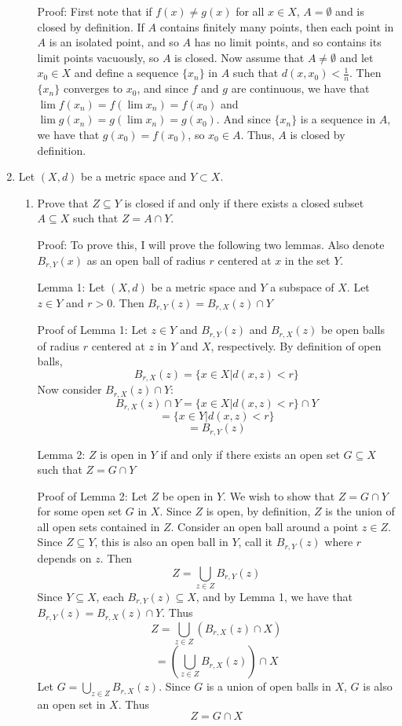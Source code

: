 \documentclass{article}
\begin{document}
\begin{enumerate}
\begin{enumerate}
    Proof: First note that if $f(x) \neq g(x)$ for all $x \in X$, $A = \emptyset$ and is closed by definition. If $A$ contains finitely many points, then each point in $A$ is an isolated point, and so $A$ has no limit points, and so contains its limit points vacuously, so $A$ is closed. Now assume that $A \neq \emptyset$ and let $x_0 \in X$ and define a sequence $\{x_n\}$ in $A$ such that $d(x,x_0) < \frac{1}{n}$. Then $\{x_n\}$ converges to $x_0$, and since $f$ and $g$ are continuous, we have that $\lim f(x_n) = f( \lim x_n) = f(x_0)$ and $\lim g(x_n) = g( \lim x_n) = g(x_0)$. And since $\{x_n\}$ is a sequence in $A$, we have that $g(x_0) = f(x_0)$, so $x_0 \in A$. Thus, $A$ is closed by definition.
    
    
    \end{enumerate}
    
    \item Let $(X,d)$ be a metric space and $Y \subset X$.
    \begin{enumerate}
        \item Prove that $Z \subseteq Y$ is closed if and only if there exists a closed subset $A \subseteq X$ such that $Z = A \cap Y$.
        
        Proof: To prove this, I will prove the following two lemmas. Also denote $B_{r,Y}(x)$ as an open ball of radius $r$ centered at $x$ in the set $Y$.
        \begin{center}
            Lemma 1: Let $(X,d)$ be a metric space and $Y$ a subspace of $X$. Let $z \in Y$ and $r > 0$. Then $B_{r,Y}(z) = B_{r,X}(z) \cap Y$
        \end{center}
        Proof of Lemma 1: Let $z \in Y$ and $B_{r,Y}(z)$ and $B_{r, X}(z)$ be open balls of radius $r$ centered at $z$ in $Y$ and $X$, respectively. By definition of open balls,
        \[B_{r,X}(z) = \{x \in X | d(x,z) < r\}\]
        Now consider $B_{r,X}(z) \cap Y$:
        \[B_{r,X}(z) \cap Y = \{x \in X | d(x,z) < r\} \cap Y\]
        \[ = \{x \in Y | d(x,z) < r\}\]
        \[ = B_{r,Y}(z)\]
        
        \begin{center}
            Lemma 2: $Z$ is open in $Y$ if and only if there exists an open set $G \subseteq X$ such that $Z = G \cap Y$
        \end{center}
        Proof of Lemma 2: Let $Z$ be open in $Y$. We wish to show that $Z = G \cap Y$ for some open set $G$ in $X$. Since $Z$ is open, by definition, $Z$ is the union of all open sets contained in $Z$. Consider an open ball around a point $z \in Z$. Since $Z \subseteq Y$, this is also an open ball in $Y$, call it $B_{r,Y}(z)$ where $r$ depends on $z$. Then
        \[Z = \bigcup_{z \in Z} B_{r,Y}(z)\]
        Since $Y \subseteq X$, each $B_{r,Y}(z) \subseteq X$, and by Lemma 1, we have that $B_{r,Y}(z) = B_{r,X}(z) \cap Y$. Thus
        \[Z = \bigcup_{z \in Z} (B_{r,X}(z) \cap X)\]
        \[ = (\bigcup_{z \in Z} B_{r, X}(z)) \cap X\]
        Let $G = \bigcup_{z \in Z} B_{r,X}(z)$. Since $G$ is a union of open balls in $X$, $G$ is also an open set in $X$. Thus
        \[Z = G \cap X\]
        

\end{enumerate}
\end{enumerate}
\end{document}
